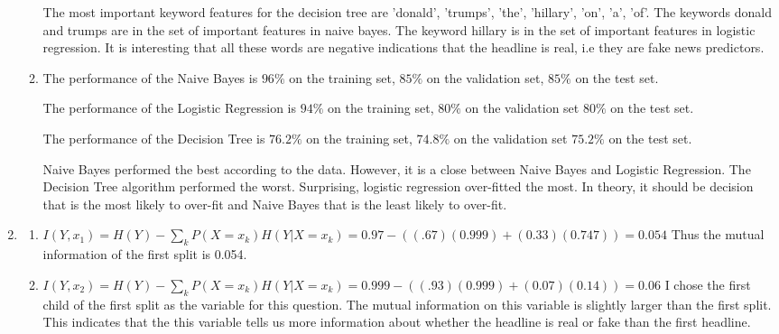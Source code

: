 \documentclass[10pt,letterpaper]{article}
\begin{document}
\begin{enumerate}
\begin{enumerate}
	The most important keyword features for the decision tree are 'donald', 'trumps', 'the', 'hillary', 'on', 'a', 'of'.
	The keywords donald and trumps are in the set of important features in naive bayes. The keyword hillary is in the set of important features in logistic regression. It is interesting that all these words are negative indications that the headline is real, i.e they are fake news predictors.
		\item %
	The performance of the Naive Bayes is $96\%$ on the training set, $85\%$ on the validation set, $85\%$ on the test set.

	The performance of the Logistic Regression is $94\%$ on the training set, $80\%$ on the validation set $80\%$ on the test set.

	The performance of the Decision Tree is $76.2\%$ on the training set, $74.8\%$ on the validation set $75.2\%$ on the test set.

	Naive Bayes performed the best according to the data. However, it is a close between Naive Bayes and Logistic Regression. The Decision Tree algorithm performed the worst. Surprising, logistic regression over-fitted the most. In theory, it should be decision that is the most likely to over-fit and Naive Bayes that is the least likely to over-fit.

	\end{enumerate}
	\item %
	\begin{enumerate}
		\item %

		$I(Y, x_{1}) = H(Y) - \sum_{k}{P(X=x_{k})H(Y|X=x_{k})}
		             = 0.97 - ((.67)(0.999) + (0.33)(0.747))
		             = 0.054$
		Thus the mutual information of the first split is 0.054.

		\item %
		$I(Y, x_{2}) = H(Y) - \sum_{k}{P(X=x_{k})H(Y|X=x_{k})}
		             = 0.999 - ((.93)(0.999) + (0.07)(0.14))
		             = 0.06$
	    I chose the first child of the first split as the variable for this question. The mutual information on this variable is slightly larger than the first split. This indicates that the this variable tells us more information about whether the headline is real or fake than the first headline.
	\end{enumerate}
	\end{enumerate}
\end{document}
